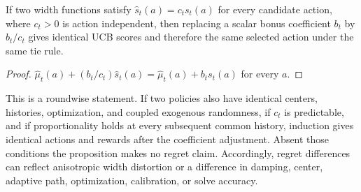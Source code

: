 \begin{proposition}\label{prop:scalar-invariance}
If two width functions satisfy $\hat s_t(a)=c_ts_t(a)$ for every candidate
action, where $c_t>0$ is action independent, then replacing a scalar bonus
coefficient $b_t$ by $b_t/c_t$ gives identical UCB scores and therefore the
same selected action under the same tie rule.
\end{proposition}
\begin{proof}
$\widehat\mu_t(a)+(b_t/c_t)\hat s_t(a)=\widehat\mu_t(a)+b_ts_t(a)$ for every $a$.
\end{proof}
This is a roundwise statement.  If two policies also have identical centers,
histories, optimization, and coupled exogenous randomness, if $c_t$ is
predictable, and if proportionality holds at every subsequent common history,
induction gives identical actions and rewards after the coefficient adjustment.
Absent those conditions the proposition makes no regret claim.  Accordingly,
regret differences can reflect anisotropic width distortion or a difference in
damping, center, adaptive path, optimization, calibration, or solve accuracy.

